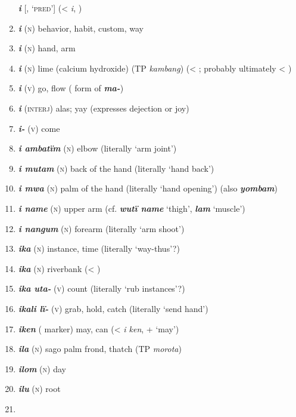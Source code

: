 \begin{enumerate}[noitemsep, label={}, align=left, widest=190, labelsep=1ex,leftmargin=*,itemindent=-10pt]
\textbf{\textit{i}} [, ‘\textsc{pred}’] (<  \textit{i}, ) \item 
\textbf{\textit{i}} (\textsc{n}) behavior, habit, custom, way \item 
\textbf{\textit{i}} (\textsc{n}) hand, arm \item 
\textbf{\textit{i}} (\textsc{n}) lime (calcium hydroxide) (TP \textit{kambang}) (< ; probably ultimately \linebreak < ) \item 
\textbf{\textit{i}} (\textsc{v}) go, flow (  form of \textbf{\textit{ma-}}) \item 
\textbf{\textit{i}} (\textsc{interj}) alas; yay (expresses dejection or joy) \item 
\textbf{\textit{i-}} (\textsc{v}) come \item 
\textbf{\textit{i ambatïm}} (\textsc{n}) elbow (literally ‘arm joint’) \item 
\textbf{\textit{i mutam}} (\textsc{n}) back of the hand (literally ‘hand back’) \item 
\textbf{\textit{i mwa}} (\textsc{n}) palm of the hand (literally ‘hand opening’) (also \textbf{\textit{yombam}}) \item 
\textbf{\textit{i name}} (\textsc{n}) upper arm (cf. \textbf{\textit{wutï name}} ‘thigh’, \textbf{\textit{lam}} ‘muscle’) \item 
\textbf{\textit{i nangum}} (\textsc{n}) forearm (literally ‘arm shoot’) \item 
\textbf{\textit{ika}} (\textsc{n}) instance, time (literally ‘way-thus’?) \item 
\textbf{\textit{ika}} (\textsc{n}) riverbank (< ) \item 
\textbf{\textit{ika uta-}} (\textsc{v}) count (literally ‘rub instances’?) \item 
\textbf{\textit{ikali lï-}} (\textsc{v}) grab, hold, catch (literally ‘send hand’) \item 
\textbf{\textit{iken}} ( marker) may, can (<  \textit{i ken},  + ‘may’) \item 
\textbf{\textit{ila}} (\textsc{n}) sago palm frond, thatch (TP \textit{morota}) \item 
\textbf{\textit{ilom}} (\textsc{n}) day \item 
\textbf{\textit{ilu}} (\textsc{n}) root \item 

\end{enumerate}
